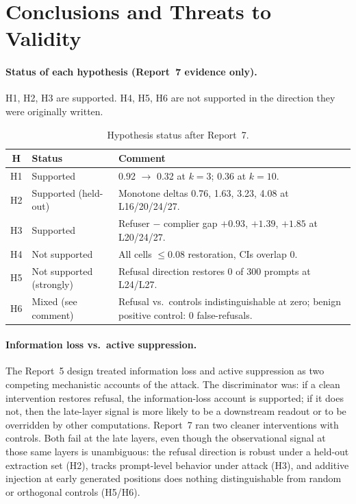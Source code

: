 \documentclass{article}
\begin{document}
\FloatBarrier

\section{Conclusions and Threats to Validity}
\label{sec:conclusions}

\paragraph{Status of each hypothesis (Report~7 evidence only).}
H1, H2, H3 are supported. H4, H5, H6 are not supported in the direction
they were originally written.

\begin{table}[h]
\centering
\small
\caption{Hypothesis status after Report~7.}
\label{tab:hyp}
\begin{tabular}{cll}
\toprule
H & Status & Comment \\
\midrule
H1 & Supported       & 0.92 $\rightarrow$ 0.32 at $k=3$; 0.36 at $k=10$. \\
H2 & Supported (held-out) & Monotone deltas 0.76, 1.63, 3.23, 4.08 at L16/20/24/27. \\
H3 & Supported       & Refuser $-$ complier gap $+0.93$, $+1.39$, $+1.85$ at L20/24/27. \\
H4 & Not supported   & All cells $\le 0.08$ restoration, CIs overlap 0. \\
H5 & Not supported (strongly) & Refusal direction restores 0 of 300 prompts at L24/L27. \\
H6 & Mixed (see comment) & Refusal vs.\ controls indistinguishable at zero; benign positive control: 0 false-refusals. \\
\bottomrule
\end{tabular}
\end{table}

\paragraph{Information loss vs.\ active suppression.}
The Report~5 design treated information loss and active suppression as two
competing mechanistic accounts of the attack. The discriminator was: if a
clean intervention restores refusal, the information-loss account is
supported; if it does not, then the late-layer signal is more likely to be
a downstream readout or to be overridden by other computations. Report~7
ran two cleaner interventions with controls. Both fail at the late layers,
even though the observational signal at those same layers is unambiguous:
the refusal direction is robust under a held-out extraction set (H2),
tracks prompt-level behavior under attack (H3), and additive injection at
early generated positions does nothing distinguishable from random or
orthogonal controls (H5/H6).
\end{document}
